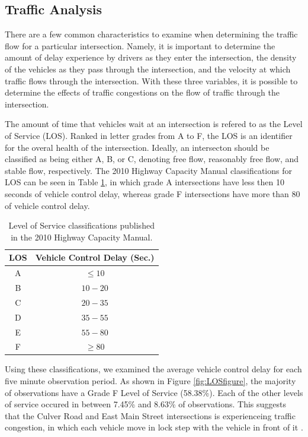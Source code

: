 \documentclass{report}
\begin{document}
\subsection*{Traffic Analysis}

There are a few common characteristics to examine when determining the traffic
flow for a particular intersection. Namely, it is important to determine the
amount of delay experience by drivers as they enter the intersection, the density
of the vehicles as they pass through the intersection, and the velocity at which
traffic flows through the intersection. With these three variables, it is possible
to determine the effects of traffic congestions on the flow of traffic through
the intersection.

The amount of time that vehicles wait at an intersection is refered to as the
Level of Service (LOS). Ranked in letter grades from A to F, the LOS is an
identifier for the overal health of the intersection. Ideally, an intersecton
should be classified as being either A, B, or C, denoting free flow, reasonably
free flow, and stable flow, respectively. The 2010 Highway Capacity
Manual classifications for LOS can be seen in Table \ref{LOStable}, in which grade
A intersections have less then 10 seconds of vehicle control delay, whereas grade
F intersections have more than 80 of vehicle control delay.

\begin{table}[h]
\centering
\caption{Level of Service classifications published in the 2010 Highway Capacity
Manual.}
\begin{tabular}{c | c}
\textbf{LOS} & \textbf{Vehicle Control Delay (Sec.)}\\\hline
A & $\le 10$\\
B & $10 - 20 $\\
C & $20 - 35$\\
D & $35 - 55$\\
E & $55 - 80$\\
F & $\ge 80$\\
\end{tabular}
\label{LOStable}
\end{table}

Using these classifications, we examined the average vehicle control delay for
each five minute observation period. As shown in Figure \ref{fig:LOSfigure},
the majority of observations have a Grade F Level of Service (58.38\%). Each of
the other levels of service occured in between 7.45\% and 8.63\% of observations.
This suggests that the Culver Road and East Main Street intersections is
experienceing traffic congestion, in which each vehicle move in lock step with
the vehicle in front of it \cite{HCM}.
\end{document}
